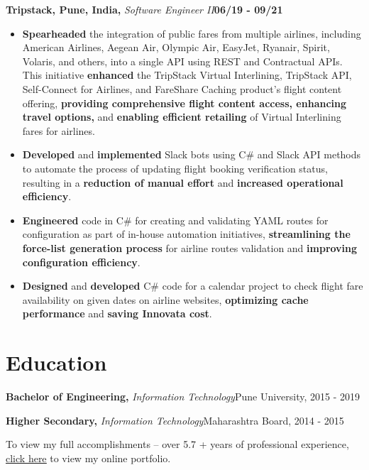 \documentclass{article}
\newcommand{\subheading}[1]{\textbf{#1}}
\newenvironment{workexp}[3]{%
  \noindent\subheading{#1,} \textit{#2}\hfill\textbf{#3}\par%
}{\bigskip}
\newenvironment{education}[4]{%
  \noindent
  \textbf{#1,} \textit{#2}\hfill{#3,} {#4}%
  \par
}{\bigskip}
\begin{document}
\begin{workexp}{Tripstack, Pune, India}{Software Engineer II}{06/19 - 09/21}
	\begin{itemize}[left=0pt, align=left]
		\item \textbf{Spearheaded} the integration of public fares from
		      multiple airlines, including American Airlines, Aegean Air,
		      Olympic Air, EasyJet, Ryanair, Spirit, Volaris, and others,
		      into a single API using REST and Contractual APIs. This
		      initiative \textbf{enhanced} the TripStack Virtual
		      Interlining, TripStack API, Self-Connect for Airlines, and
		      FareShare Caching product's flight content offering,
		      \textbf{providing comprehensive flight content access, enhancing
		      travel options,}
		      and \textbf{enabling efficient retailing}
		      of Virtual Interlining fares for airlines.
		          
		\item \textbf{Developed} and \textbf{implemented} Slack bots using C\#
		      and Slack API methods to automate the process of updating
		      flight booking verification status, resulting in a
		      \textbf{reduction of manual effort}
		      and \textbf{increased operational efficiency}.
		          
		\item \textbf{Engineered} code in C\# for creating and validating
		      YAML routes for configuration as part of in-house automation
		      initiatives, \textbf{streamlining the force-list generation process}
		      for airline routes validation and
		      \textbf{improving configuration efficiency}.
		          
		\item \textbf{Designed} and \textbf{developed} C\# code for a calendar
		      project to check flight fare availability on given dates on
		      airline websites, \textbf{optimizing cache performance}
		      and \textbf{saving Innovata cost}.
	\end{itemize}
\end{workexp}


\section*{Education}
\begin{education}{Bachelor of Engineering}{Information Technology}{Pune University}{2015 - 2019}
\end{education}
\begin{education}{Higher Secondary}{Information Technology}{Maharashtra Board}{2014 - 2015}
\end{education}

\noindent
To view my full accomplishments – over 5.7 
+ years of professional experience, \underline{\href{https://riteshn31.github.io/}{click here}} to view my online portfolio.
\end{document}
